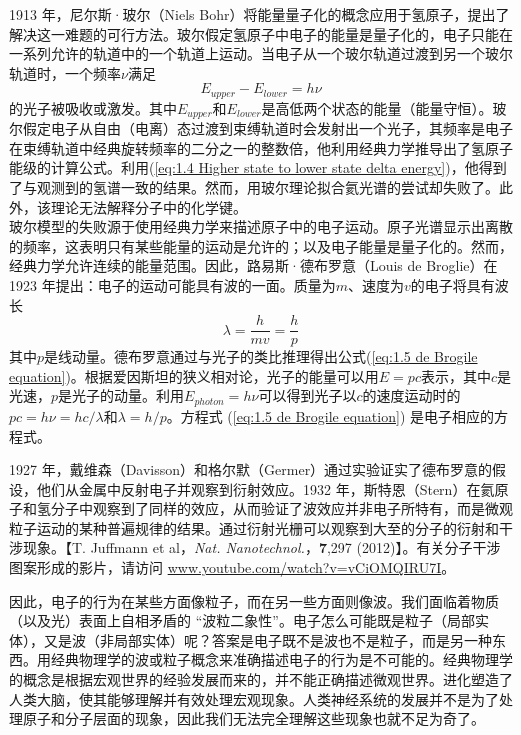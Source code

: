 	1913 年，尼尔斯·玻尔（Niels Bohr）将能量量子化的概念应用于氢原子，提出了解决这一难题的可行方法。玻尔假定氢原子中电子的能量是量子化的，电子只能在一系列允许的轨道中的一个轨道上运动。当电子从一个玻尔轨道过渡到另一个玻尔轨道时，一个频率$\nu$满足
	\begin{equation}
		\boxed{E_{upper}-E_{lower}=h\nu}
		\label{eq:1.4 Higher state to lower state delta energy}
	\end{equation}
	的光子被吸收或激发。其中$E_{upper}$和$E_{lower}$是高低两个状态的能量（能量守恒）。玻尔假定电子从自由（电离）态过渡到束缚轨道时会发射出一个光子，其频率是电子在束缚轨道中经典旋转频率的二分之一的整数倍，他利用经典力学推导出了氢原子能级的计算公式。利用(\ref{eq:1.4 Higher state to lower state delta energy})，他得到了与观测到的氢谱一致的结果。然而，用玻尔理论拟合氦光谱的尝试却失败了。此外，该理论无法解释分子中的化学键。\\
	\indent 玻尔模型的失败源于使用经典力学来描述原子中的电子运动。原子光谱显示出离散的频率，这表明只有某些能量的运动是允许的；以及电子能量是量子化的。然而，经典力学允许连续的能量范围。因此，路易斯·德布罗意（Louis de Broglie）在 1923 年提出：电子的运动可能具有波的一面。质量为$m$、速度为$v$的电子将具有波长
	\begin{equation}
		\lambda=\frac{h}{mv}=\frac{h}{p}
		\label{eq:1.5 de Brogile equation}
	\end{equation}
	其中$p$是线动量。德布罗意通过与光子的类比推理得出公式(\ref{eq:1.5 de Brogile equation})。根据爱因斯坦的狭义相对论，光子的能量可以用$E=pc$表示，其中$c$是光速，$p$是光子的动量。利用$E_{photon}=h\nu$可以得到光子以$c$的速度运动时的$pc=h\nu =hc/\lambda$和$\lambda = h/p$。方程式 (\ref{eq:1.5 de Brogile equation}) 是电子相应的方程式。

	1927 年，戴维森（Davisson）和格尔默（Germer）通过实验证实了德布罗意的假设，他们从金属中反射电子并观察到衍射效应。1932 年，斯特恩（Stern）在氦原子和氢分子中观察到了同样的效应，从而验证了波效应并非电子所特有，而是微观粒子运动的某种普遍规律的结果。通过衍射光栅可以观察到大至的分子的衍射和干涉现象。【T. Juffmann et al，\textit{Nat. Nanotechnol.}，\textbf{7},297 (2012)】。有关分子干涉图案形成的影片，请访问 \url{www.youtube.com/watch?v=vCiOMQIRU7I}。

	因此，电子的行为在某些方面像粒子，而在另一些方面则像波。我们面临着物质（以及光）表面上自相矛盾的 “波粒二象性”。电子怎么可能既是粒子（局部实体），又是波（非局部实体）呢？答案是电子既不是波也不是粒子，而是另一种东西。用经典物理学的波或粒子概念来准确描述电子的行为是不可能的。经典物理学的概念是根据宏观世界的经验发展而来的，并不能正确描述微观世界。进化塑造了人类大脑，使其能够理解并有效处理宏观现象。人类神经系统的发展并不是为了处理原子和分子层面的现象，因此我们无法完全理解这些现象也就不足为奇了。

